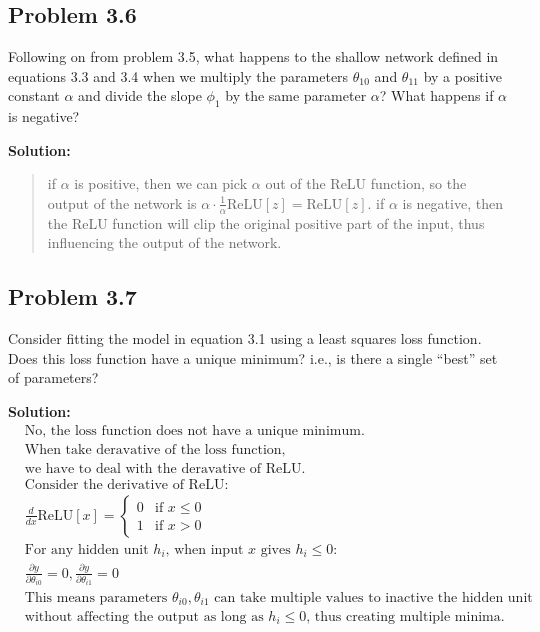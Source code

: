 \documentclass{article}
\begin{document}
    \subsection*{Problem 3.6}
    Following on from problem 3.5, what happens to the shallow network defined in equations 3.3 and 3.4 when we multiply the parameters $\theta_{10}$ and $\theta_{11}$ by a positive constant $\alpha$ and divide the slope $\phi_1$ by the same parameter $\alpha$? What happens if $\alpha$ is negative?

        \vspace{1cm}
        \textbf{Solution:}
        \begin{quote}
            if $\alpha$ is positive, then we can pick $\alpha$ out of the ReLU function, so the output of the network is $\alpha \cdot \frac{1}{\alpha} \text{ReLU}[z] = \text{ReLU}[z]$.
            if $\alpha$ is negative, then the ReLU function will clip the original positive part of the input, thus influencing the output of the network.
        \end{quote}
        
    \subsection*{Problem 3.7}
    Consider fitting the model in equation 3.1 using a least squares loss function. Does this loss function have a unique minimum? i.e., is there a single ``best'' set of parameters?

        \vspace{1cm}
        \textbf{Solution:}
        \begin{align*}
            &\text{No, the loss function does not have a unique minimum.} \\
            &\text{When take deravative of the loss function,  } \\
            &\text{we have to deal with the deravative of ReLU.} \\
            &\text{Consider the derivative of ReLU:} \\
            &\frac{d}{dx}\text{ReLU}[x] = \begin{cases}
                0 & \text{if } x \leq 0 \\
                1 & \text{if } x > 0
            \end{cases} \\
            &\text{For any hidden unit } h_i \text{, when input } x \text{ gives } h_i \leq 0\text{:} \\
            &\frac{\partial y}{\partial \theta_{i0}} = 0 , \frac{\partial y}{\partial \theta_{i1}} = 0 \\
            &\text{This means parameters } \theta_{i0}, \theta_{i1} \text{ can take multiple values to inactive the hidden unit} \\
            &\text{without affecting the output as long as } h_i \leq 0\text{, thus creating multiple minima.}
        \end{align*}
\end{document}
